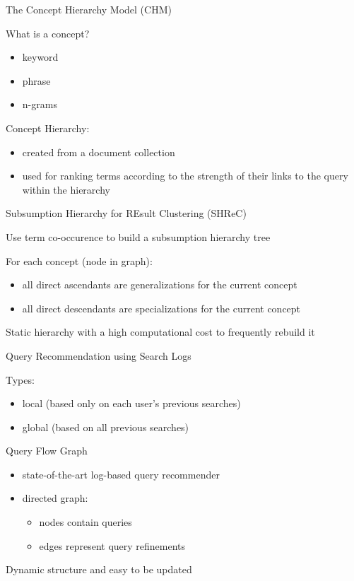 \begin{frame}{The Concept Hierarchy Model (CHM)}

What is a concept?
\begin{itemize}
	\item keyword
	\item phrase
	\item n-grams \newline
\end{itemize}

Concept Hierarchy:
\begin{itemize}
	\item created from a document collection
	\item used for ranking terms according to the strength of their links to the query within the hierarchy
\end{itemize}

\end{frame}


\begin{frame}{Subsumption Hierarchy for REsult Clustering (SHReC)}

Use term co-occurence to build a subsumption hierarchy tree \newline

For each concept (node in graph):
\begin{itemize}
	\item all direct ascendants are generalizations for the current concept
	\item all direct descendants are specializations for the current concept \newline
\end{itemize}

Static hierarchy with a high computational cost to frequently rebuild it 

\end{frame}


\begin{frame}{Query Recommendation using Search Logs}

Types:
\begin{itemize}
	\item local (based only on each user's previous searches)
	\item global (based on all previous searches) \newline
\end{itemize}

Query Flow Graph
\begin{itemize}
	\item state-of-the-art log-based query recommender
	\item directed graph:
		\begin{itemize}
			\item nodes contain queries
			\item edges represent query refinements \newline
		\end{itemize}
\end{itemize}

Dynamic structure and easy to be updated

\end{frame}


